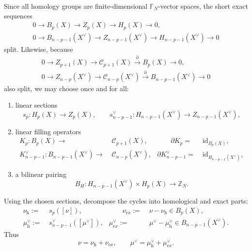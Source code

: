 \documentclass[dvipsnames,a4paper]{article}
\numberwithin{equation}{section}
\theoremstyle{definition}
\theoremstyle{remark}
\begin{document}
Since all homology groups are finite-dimensional \(\mathbb F_N\)-vector spaces, the short
exact sequences
\begin{equation}\begin{gathered}
		0\to B_p(X)\to Z_p(X)\to H_p(X)\to 0,
		\\
		0\to B_{n-p-1}(X^\vee)\to Z_{n-p-1}(X^\vee)\to H_{n-p-1}(X^\vee)\to 0
\end{gathered}\end{equation}
split. Likewise, because
\begin{equation}\begin{gathered}
		0\to Z_{p+1}(X)\to \mathcal C_{p+1}(X)\xrightarrow{\partial} B_p(X)\to 0,
		\\
		0\to Z_{n-p}(X^\vee)\to \mathcal C_{n-p}(X^\vee)\xrightarrow{\partial} B_{n-p-1}(X^\vee)\to 0
\end{gathered}\end{equation}
also split, we may choose once and for all:
\begin{enumerate}
	\item linear sections
	\begin{equation}
		s_p:H_p(X)\rightarrow Z_p(X),
		\qquad
		s^\vee_{n-p-1}:H_{n-p-1}(X^\vee)\rightarrow Z_{n-p-1}(X^\vee),
		\label{eq:sections}
	\end{equation}
	\item linear filling operators
	\begin{align}
		K_p:B_p(X)\rightarrow&\; \mathcal C_{p+1}(X),
		&\qquad
		\partial K_p=&\;\mathrm{id}_{B_p(X)},
		\label{eq:Kp}
	\\
		K^\vee_{n-p-1}:B_{n-p-1}(X^\vee)\rightarrow&\; \mathcal C_{n-p}(X^\vee),
		&
		\partial K^\vee_{n-p-1}=&\;\mathrm{id}_{B_{n-p-1}(X^\vee)},
		\label{eq:Kdual}
	\end{align}
	\item a bilinear pairing
	\begin{equation}
		B_H:H_{n-p-1}(X^\vee)\times H_p(X)\rightarrow \mathbb Z_N.
		\label{eq:BH}
	\end{equation}
\end{enumerate}

Using the chosen sections, decompose the cycles into homological and exact parts:
\begin{equation}
\begin{aligned}
	\nu_{\mathrm h}:=&\;s_p([\nu]),
	&\qquad
	\nu_{\mathrm ex}:=&\;\nu-\nu_{\mathrm h}\in B_p(X),
	\\
	\mu^\vee_{\mathrm h}:=&\;s^\vee_{n-p-1}([\mu^\vee]),
	&
	\mu^\vee_{\mathrm ex}:=&\;\mu^\vee-\mu^\vee_{\mathrm h}\in B_{n-p-1}(X^\vee).
\end{aligned}
\end{equation}
Thus
\begin{equation}
	\nu=\nu_{\mathrm h}+\nu_{\mathrm ex},
	\qquad
	\mu^\vee=\mu^\vee_{\mathrm h}+\mu^\vee_{\mathrm ex}.
	\label{eq:total-decomp}
\end{equation}
\end{document}
